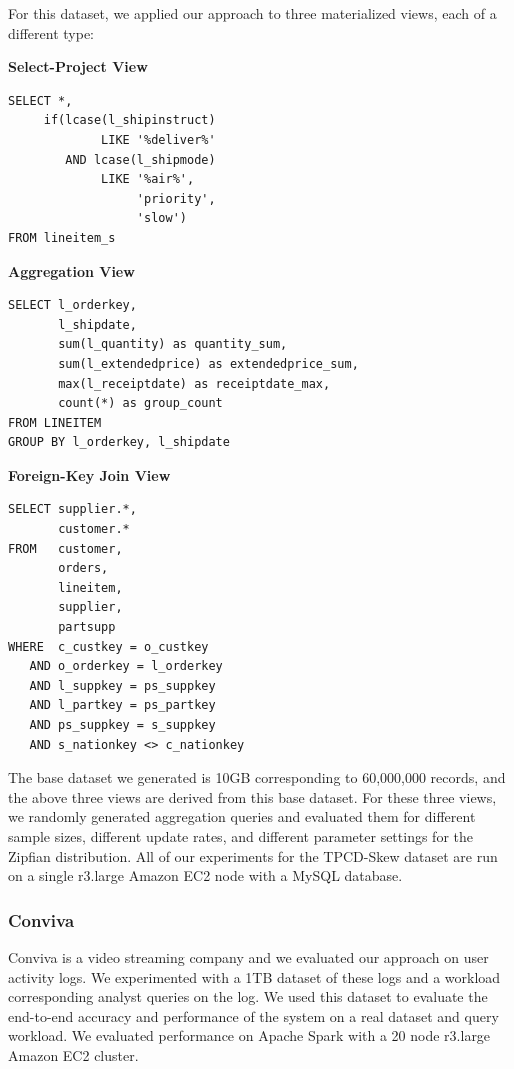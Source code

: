 For this dataset, we applied our approach to three materialized views, each of a different type:
\vspace{1em}

\textbf{Select-Project View}
\begin{lstlisting}
SELECT *, 
     if(lcase(l_shipinstruct) 
     	     LIKE '%deliver%' 
        AND lcase(l_shipmode) 
             LIKE '%air%',
                  'priority',
                  'slow') 
FROM lineitem_s
\end{lstlisting}

\vspace{1em}

\textbf{Aggregation View}
\begin{lstlisting}
SELECT l_orderkey, 
       l_shipdate, 
       sum(l_quantity) as quantity_sum, 
       sum(l_extendedprice) as extendedprice_sum, 
       max(l_receiptdate) as receiptdate_max, 
       count(*) as group_count 
FROM LINEITEM 
GROUP BY l_orderkey, l_shipdate
\end{lstlisting}

\vspace{1em}

\textbf{Foreign-Key Join View}
\begin{lstlisting}
SELECT supplier.*, 
	   customer.* 
FROM   customer, 
       orders, 
       lineitem, 
       supplier, 
       partsupp 
WHERE  c_custkey = o_custkey 
   AND o_orderkey = l_orderkey 
   AND l_suppkey = ps_suppkey 
   AND l_partkey = ps_partkey 
   AND ps_suppkey = s_suppkey 
   AND s_nationkey <> c_nationkey
\end{lstlisting}

\vspace{1em}

The base dataset we generated is 10GB corresponding to 60,000,000 records, and the above three views are derived from this base dataset.
For these three views, we randomly generated aggregation queries and evaluated them for different sample sizes, different update rates, and different parameter settings for the Zipfian distribution.
All of our experiments for the TPCD-Skew dataset are run on a single r3.large Amazon EC2 node with a MySQL database.

\subsubsection{Conviva}
Conviva is a video streaming company and we evaluated our approach on user activity logs. 
We experimented with a 1TB dataset of these logs and a workload corresponding analyst queries on the log.
We used this dataset to evaluate the end-to-end accuracy and performance of the system on a real dataset and query workload.
We evaluated performance on Apache Spark with a 20 node r3.large Amazon EC2 cluster. 


